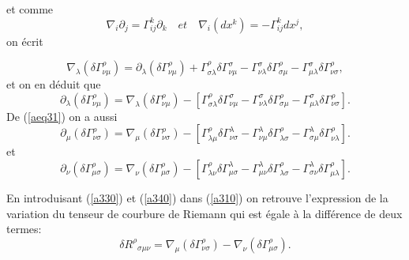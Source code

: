 \documentclass[a4paper,12pt]{report}
\theoremstyle{plain}
\theoremstyle{plain}
\begin{document}
et comme  $$\nabla_{i} \partial_{j}= \Gamma_{ij}^{k} \partial_{k} \quad  et \quad  \nabla_{i} (dx^{k}) =-\Gamma_{ij}^{k} dx^{j},  $$ 
on  \'ecrit

$$
  \nabla_\lambda (\delta \Gamma^\rho_{\nu\mu} ) = \partial_\lambda 
(\delta \Gamma^\rho_{\nu\mu} ) + \Gamma^\rho_{\sigma\lambda} 
\delta\Gamma^\sigma_{\nu\mu} - \Gamma^\sigma_{\nu\lambda} \delta 
\Gamma^\rho_{\sigma\mu} - \Gamma^\sigma_{\mu\lambda} \delta 
\Gamma^\rho_{\nu\sigma},  $$
et on en d\'eduit que
 \begin{equation}
\partial_\lambda (\delta \Gamma^\rho_{\nu\mu} )= \nabla_\lambda (\delta \Gamma^\rho_{\nu\mu} )-[ \Gamma^\rho_{\sigma\lambda} 
\delta\Gamma^\sigma_{\nu\mu} - \Gamma^\sigma_{\nu\lambda} \delta 
\Gamma^\rho_{\sigma\mu} - \Gamma^\sigma_{\mu\lambda} \delta \Gamma^\rho_{\nu\sigma}].    \label{aeq31}
\end{equation}
  De    (\ref{aeq31}) on a aussi
\begin{equation} 
\partial_\mu (\delta \Gamma^\rho_{\nu\sigma} )= \nabla_\mu (\delta \Gamma^\rho_{\nu\sigma} )-[ \Gamma^\rho_{\lambda\mu} 
\delta\Gamma^\lambda_{\nu\sigma} - \Gamma^\lambda_{\nu\mu} \delta 
\Gamma^\rho_{\lambda\sigma} - \Gamma^\lambda_{\sigma\mu} \delta \Gamma^\rho_{\nu\lambda}] \label{a330}.  
\end{equation}
et
\begin{equation}
 \partial_\nu (\delta \Gamma^\rho_{\mu\sigma} )= \nabla_\nu (\delta \Gamma^\rho_{\mu\sigma} )-[ \Gamma^\rho_{\lambda\nu} 
\delta\Gamma^\lambda_{\mu\sigma} - \Gamma^\lambda_{\mu\nu} \delta 
\Gamma^\rho_{\lambda\sigma} - \Gamma^\lambda_{\sigma\nu} \delta \Gamma^\rho_{\mu\lambda}].    \label{a340}
\end{equation}

En introduisant (\ref{a330}) et (\ref{a340}) dans (\ref{a310}) on retrouve l'expression de la variation du tenseur de courbure de Riemann  qui
 est \'egale \`a la diff\'erence de deux termes:
\begin{equation}
   \delta R^\rho{}_{\sigma\mu\nu} = \nabla_\mu (\delta 
\Gamma^\rho_{\nu\sigma}) - \nabla_\nu (\delta \Gamma^\rho_{\mu\sigma}).  \label{aeq32}
\end{equation}
\end{document}
